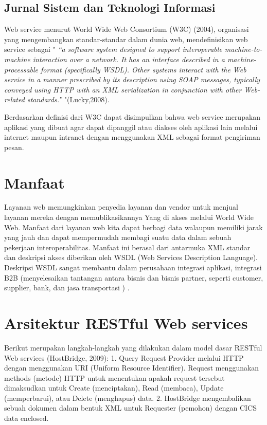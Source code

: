 \documentclass[12pt]{journal}
\begin{document}
\subsection{Jurnal Sistem dan Teknologi Informasi}

Web service menurut World Wide Web Consortium (W3C) (2004), organisasi yang mengembangkan standar-standar dalam dunia web, mendefinisikan web service sebagai "
\textit{“a software system designed to support interoperable machine-to-machine interaction over a network. It has an interface described in a machine-processable format (specifically WSDL). Other systems interact with the Web service in a manner prescribed by its description using SOAP messages, typically conveyed using HTTP with an XML serialization in conjunction with other Web-related standards.” }"(Lucky,2008).

Berdasarkan definisi dari W3C dapat disimpulkan bahwa web service merupakan aplikasi yang dibuat agar dapat dipanggil atau diakses oleh aplikasi lain melalui internet maupun intranet dengan menggunakan XML sebagai format pengiriman pesan\cite{prasetya2013perancangan}.

\section{Manfaat}

Layanan web memungkinkan penyedia layanan dan vendor untuk menjual layanan mereka dengan memublikasikannya
Yang di akses melalui World Wide Web.
Manfaat dari layanan web kita dapat berbagi data walaupun memiliki jarak yang jauh dan dapat mempermudah membagi suatu data dalam sebuah pekerjaan
interoperabilitas. Manfaat ini berasal dari antarmuka XML standar dan deskripsi akses
diberikan oleh WSDL (Web Services Description Language). Deskripsi WSDL sangat membantu dalam perusahaan
integrasi aplikasi, integrasi B2B (menyelesaikan tantangan antara bisnis dan bisnis partner, seperti customer, supplier, bank, dan jasa transportasi ) \cite{ferris2003web}.

\section{Arsitektur RESTful Web services}

Berikut merupakan langkah-langkah yang dilakukan dalam model dasar RESTful Web services (HostBridge, 2009):
1. Query Request Provider melalui HTTP dengan menggunakan URI (Uniform Resource Identifier). Request menggunakan methods (metode) HTTP untuk menentukan apakah request tersebut dimaksudkan untuk Create (menciptakan), Read (membaca), Update (memperbarui), atau Delete (menghapus) data.
2. HostBridge mengembalikan sebuah dokumen dalam bentuk XML untuk Requester (pemohon) dengan CICS data enclosed\cite{arsana2014rancang}.
\end{document}
